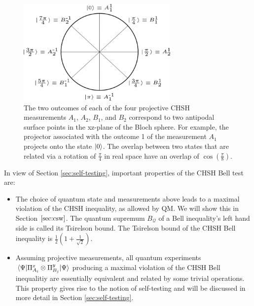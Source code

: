 \begin{figure}
    \centering
    \includegraphics[width=0.7\textwidth]{images/chshmnts.png}
    \caption{The two outcomes of each of the four projective CHSH measurements $A_1$, $A_2$, $B_1$, and $B_2$ correspond to two antipodal surface points in the xz-plane of the Bloch sphere. For example, the projector associated with the outcome 1 of the measurement $A_1$ projects onto the state $\ket{0}$. The overlap between two states that are related via a rotation of $\frac{\pi}{4}$ in real space have an overlap of $\cos(\frac{\pi}{8})$.}
    \label{fig:chshmnts}
\end{figure}

In view of Section \ref{sec:self-testing}, important properties of the CHSH Bell test are:
\begin{itemize}
    \item The choice of quantum state and measurements above leads to a maximal violation of the CHSH inequality, as allowed by QM. We will show this in Section $\ref{sec:csw}$. The quantum supremum $B_\mathcal{Q}$ of a Bell inequality's left hand side is called its Tsirelson bound. The Tsirelson bound of the CHSH Bell inequality is $\frac{1}{2}(1+\frac{1}{\sqrt{2}})$.
    \item Assuming projective measurements, all quantum experiments $\expval{\Pi_{A_i}^x\otimes\Pi_{B_j}^y}{\Psi}$ producing a maximal violation of the CHSH Bell inequalitiy are essentially equivalent and related by some trivial operations. This property gives rise to the notion of self-testing and will be discussed in more detail in Section \ref{sec:self-testing}.
\end{itemize}

